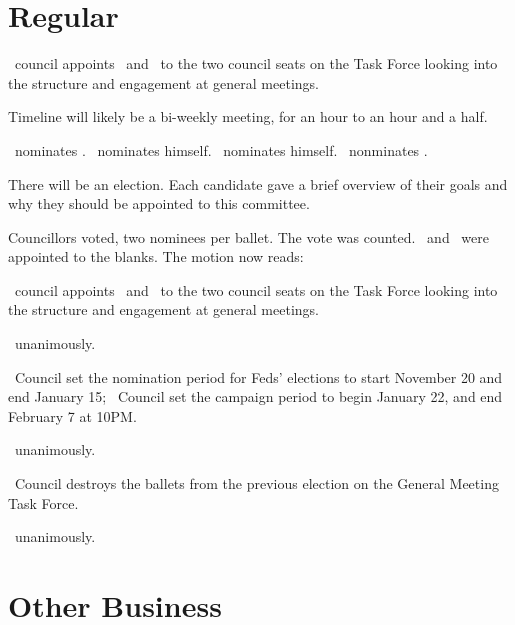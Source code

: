 \section*{Regular}
\begin{motion}
    \birt\ council appoints \blank\ and \blank\ to the two council seats on the
    Task Force looking into the structure and engagement at general meetings. 
    \movers{\antonio}{\brian}

    Timeline will likely be a bi-weekly meeting, for an hour to an hour and a
    half.

    \alexander\ nominates \seneca. 
    \jason\ nominates himself.
    \alexander\ nominates himself.
    \andrewc\ nonminates \ben.

    There will be an election. Each candidate gave a brief overview of their
    goals and why they should be appointed to this committee.

    Councillors voted, two nominees per ballet.
    The vote was counted. \alexander\ and \ben\ were appointed to the blanks. 
    The motion now reads:

    \begin{motion}
        \birt\ council appoints \alexander\ and \ben\ to the two council seats
        on the Task Force looking into the structure and engagement at general
        meetings. 
    \end{motion}

    \carries\ unanimously.
\end{motion}

\begin{motion}
    \birt\ Council set the nomination period for Feds' elections to start 
    November 20 and end January 15; 
    \bifrt\ Council set the campaign period to begin January 22, and 
    end February 7 at 10PM.%
    \movers{\antonio}{\seneca}

    \carries\ unanimously.
\end{motion}

\begin{motion}
    \birt\ Council destroys the ballets from the previous election on the
    General Meeting Task Force. 
    \movers{\brian}{\jason}

    \carries\ unanimously.
\end{motion}

\section*{Other Business}

